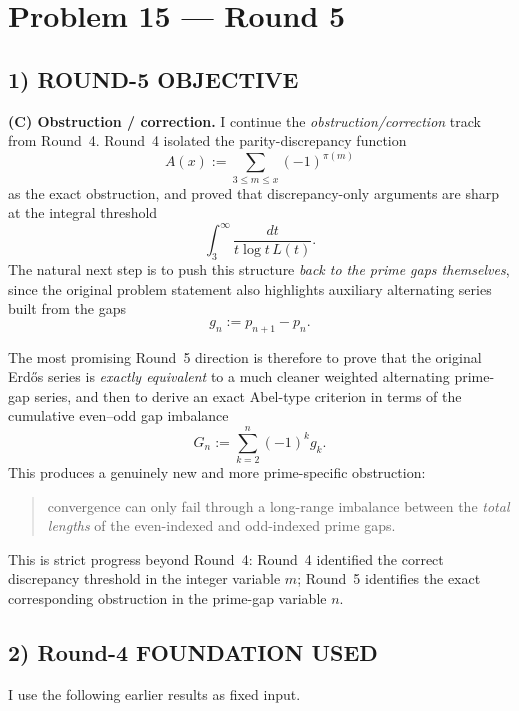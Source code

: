\section{Problem 15 --- Round 5}

\subsection*{1) ROUND-5 OBJECTIVE}

\textbf{(C) Obstruction / correction.}
I continue the \emph{obstruction/correction} track from Round~4.
Round~4 isolated the parity-discrepancy function
\[
A(x):=\sum_{3\le m\le x} (-1)^{\pi(m)}
\]
as the exact obstruction, and proved that discrepancy-only arguments are sharp at the integral threshold
\[
\int_3^\infty \frac{dt}{t\log t\,L(t)}.
\]
The natural next step is to push this structure \emph{back to the prime gaps themselves}, since the original problem statement also highlights auxiliary alternating series built from the gaps
\[
g_n:=p_{n+1}-p_n.
\]

The most promising Round~5 direction is therefore to prove that the original Erd\H{o}s series is \emph{exactly equivalent} to a much cleaner weighted alternating prime-gap series, and then to derive an exact Abel-type criterion in terms of the cumulative even--odd gap imbalance
\[
G_n:=\sum_{k=2}^n (-1)^k g_k.
\]
This produces a genuinely new and more prime-specific obstruction:
\begin{quote}
convergence can only fail through a long-range imbalance between the \emph{total lengths} of the even-indexed and odd-indexed prime gaps.
\end{quote}

This is strict progress beyond Round~4: Round~4 identified the correct discrepancy threshold in the integer variable $m$; Round~5 identifies the exact corresponding obstruction in the prime-gap variable $n$.

\subsection*{2) Round-4 FOUNDATION USED}

I use the following earlier results as fixed input.

